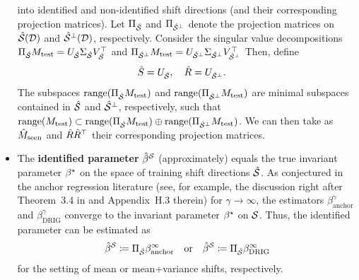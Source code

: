 \begin{itemize}
into identified and non-identified shift directions (and their corresponding projection matrices). 
Let $\Pi_{\hat{\mathcal{S}}}$ and $\Pi_{\hat{\mathcal{S}}^\perp}$ denote the projection matrices on $\hat{\mathcal{S}}(\mathcal{D})$ and $\hat{\mathcal{S}}^\perp(\mathcal{D})$, respectively. Consider the singular value decompositions $\Pi_{\hat{\mathcal{S}}} M_{\mathrm{test}} = U_{\hat{\mathcal{S}}} \Sigma_{\hat{\mathcal{S}}} V_{\hat{\mathcal{S}}}^\top$ and $\Pi_{\hat{\mathcal{S}}^\perp} M_{\mathrm{test}} = U_{\hat{\mathcal{S}}^\perp} \Sigma_{\hat{\mathcal{S}}^\perp} V_{\hat{\mathcal{S}}^\perp}^\top$ Then,  define
\begin{align*}
\hat{S} &= U_{\hat{\mathcal{S}}}, \quad \hat{R} = U_{\hat{\mathcal{S}}^\perp}.
\end{align*}
The subspaces $\mathrm{range} (\Pi_{\hat{\mathcal{S}}} M_{\mathrm{test}})$ and $\mathrm{range}( \Pi_{\hat{\mathcal{S}}^\perp} M_{\mathrm{test}})$ are minimal subspaces contained in $\hat{\mathcal{S}}$ and $\hat{\mathcal{S}}^\perp$, respectively, such that $\mathrm{range}(M_{\mathrm{test}}) \subset \mathrm{range}( \Pi_{\hat{\mathcal{S}}} M_{\mathrm{test}}) \oplus \mathrm{range}( \Pi_{\hat{\mathcal{S}}^\perp} M_{\mathrm{test}})$. We can then take as $\hat{M}_{\mathrm{seen}}$ and $\hat{R}\hat{R}^\top$ their corresponding projection matrices. 
\item The \textbf{identified parameter} $\hat{\beta}^{\mathcal{S}}$ (approximately) equals the true invariant parameter $\beta^{\star}$ on the space of training shift directions $\hat{\mathcal{S}}$. 
As conjectured in the anchor regression literature \citep{rothenhausler2021anchor,shen2023causalityoriented, jakobsen2022distributional} (see, for example, the discussion right after Theorem~3.4 in \citep{jakobsen2022distributional} and Appendix~H.3 therein)
for $\gamma \to \infty$, the estimators $\beta^{\gamma}_{\mathrm{anchor}}$ and $\beta^{\gamma}_{\mathrm{DRIG}}$ converge to the invariant parameter $\beta^{\star}$ on $\mathcal{S}$. Thus, the identified parameter can be estimated as
\begin{align*}
    \hat{\beta}^{\mathcal{S}} \coloneqq \Pi_{\hat{\mathcal{S}}} \beta^{\infty}_{\mathrm{anchor}} \quad \text{or} \quad \hat{\beta}^{\mathcal{S}} \coloneqq \Pi_{\hat{\mathcal{S}}} \beta^{\infty}_{\mathrm{DRIG}}
\end{align*}
for the setting of mean or mean+variance shifts, respectively. 
\end{itemize}

